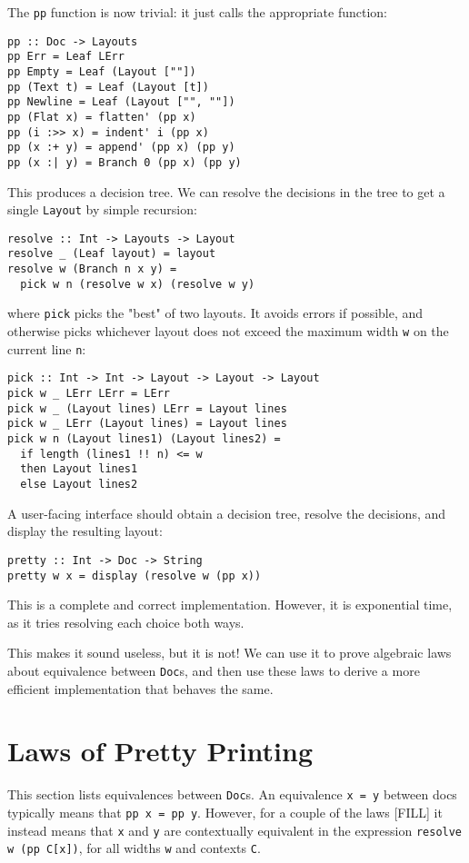 \documentclass{article}
\newcommand{\code}[1]{\texttt{#1}}
\begin{document}
The \code{pp} function is now trivial: it just calls the appropriate function:
\begin{lstlisting}
pp :: Doc -> Layouts
pp Err = Leaf LErr
pp Empty = Leaf (Layout [""])
pp (Text t) = Leaf (Layout [t])
pp Newline = Leaf (Layout ["", ""])
pp (Flat x) = flatten' (pp x)
pp (i :>> x) = indent' i (pp x)
pp (x :+ y) = append' (pp x) (pp y)
pp (x :| y) = Branch 0 (pp x) (pp y)
\end{lstlisting}

This produces a decision tree. We can resolve the decisions in the tree to get a single
\code{Layout} by simple recursion:
\begin{lstlisting}
resolve :: Int -> Layouts -> Layout
resolve _ (Leaf layout) = layout
resolve w (Branch n x y) =
  pick w n (resolve w x) (resolve w y)
\end{lstlisting}
where \code{pick} picks the "best" of two layouts. It avoids errors if possible, and otherwise picks
whichever layout does not exceed the maximum width \code{w} on the current line \code{n}:
\begin{lstlisting}
pick :: Int -> Int -> Layout -> Layout -> Layout
pick w _ LErr LErr = LErr
pick w _ (Layout lines) LErr = Layout lines
pick w _ LErr (Layout lines) = Layout lines
pick w n (Layout lines1) (Layout lines2) =
  if length (lines1 !! n) <= w
  then Layout lines1
  else Layout lines2
\end{lstlisting}

A user-facing interface should obtain a decision tree, resolve the decisions, and display the
resulting layout:
\begin{lstlisting}
pretty :: Int -> Doc -> String
pretty w x = display (resolve w (pp x))
\end{lstlisting}

This is a complete and correct implementation. However, it is exponential time, as it tries
resolving each choice both ways.

This makes it sound useless, but it is not! We can use it to prove algebraic laws about equivalence
between \code{Doc}s, and then use these laws to derive a more efficient implementation that behaves
the same.

\section{Laws of Pretty Printing}

This section lists equivalences between \code{Doc}s. An equivalence \code{x = y} between docs
typically means that \code{pp x = pp y}. However, for a couple of the laws [FILL] it instead means
that \code{x} and \code{y} are contextually equivalent in the expression \code{resolve w (pp C[x])},
for all widths \code{w} and contexts \code{C}.
\end{document}
